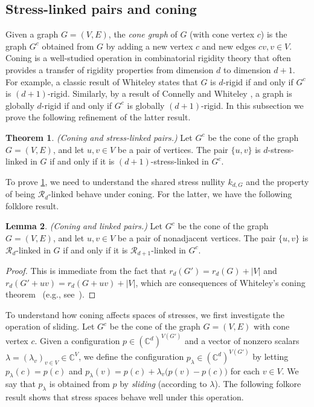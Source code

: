 \documentclass[11pt,a4paper,dvipsnames]{scrartcl}
\theoremstyle{definition}
\newtheorem{theorem}{Theorem}[section]
\newtheorem{lemma}[theorem]{Lemma}
\newcommand{\CC}{\mathbb{C}}
\newcommand{\stressnullity}[1]{k_{d, #1}}
\newcommand{\strongly}[1]{${#1}$-stress-linked}
\newcommand{\coneG}{G^c}
\begin{document}
\subsection{Stress-linked pairs and coning}

Given a graph $G = (V,E)$, the \emph{cone graph} of $G$ (with cone vertex $c$) is the graph $\coneG$ obtained from $G$ by adding a new vertex $c$ and new edges $cv, v \in V$. Coning is a well-studied operation in combinatorial rigidity theory that often provides a transfer of rigidity properties from dimension $d$ to dimension $d+1$. For example, a classic result of Whiteley \cite{whiteley_cones} states that $G$ is $d$-rigid if and only if $\coneG$ is $(d+1)$-rigid. Similarly, by a result of Connelly and Whiteley \cite{connelly.whiteley_2010}, a graph is globally $d$-rigid if and only if $\coneG$ is globally $(d+1)$-rigid. In this subsection we prove the following refinement of the latter result.

\begin{theorem}\label{theorem:stresslinkedconing} \emph{(Coning and stress-linked pairs.)} \newline
    Let $\coneG$ be the cone of the graph $G = (V,E)$, and let $u,v \in V$ be a pair of vertices. The pair $\{u,v\}$ is \strongly{d} in $G$ if and only if it is \strongly{(d+1)} in $\coneG$.
\end{theorem}

To prove \cref{theorem:stresslinkedconing}, we need to understand the shared stress nullity $\stressnullity{G}$ and the property of being $\mathcal{R}_d$-linked behave under coning. For the latter, we have the following folklore result.

\begin{lemma}\label{lemma:linkedconing} \emph{(Coning and linked pairs.)} \newline
    Let $\coneG$ be the cone of the graph $G = (V,E)$, and let $u,v \in V$ be a pair of nonadjacent vertices. The pair $\{u,v\}$ is $\mathcal{R}_d$-linked in $G$ if and only if it is $\mathcal{R}_{d+1}$-linked in $\coneG$. 
\end{lemma}
\begin{proof}
    This is immediate from the fact that $r_d(G') = r_d(G) + |V|$ and $r_d(G' + uv) = r_d(G+uv) + |V|$, which are consequences of Whiteley's coning theorem~\cite{whiteley_cones} (e.g., see~\cite[Theorem 5.2]{garamvolgyi.etal_2022}).
\end{proof}

To understand how coning affects spaces of stresses, we first investigate the operation of sliding.
Let $\coneG$ be the cone of the graph $G = (V,E)$ with cone vertex $c$. Given a configuration $p \in (\CC^d)^{V(G')}$ and a vector of nonzero scalars $\lambda = {(\lambda_v)}_{v \in V} \in \CC^V$, we define the configuration $p_\lambda \in (\CC^d)^{V(G')}$ by letting $p_\lambda(c) = p(c)$ and $p_\lambda(v) = p(c) + \lambda_v\big(p(v) - p(c)\big)$ for each $v \in V$. We say that $p_\lambda$ is obtained from $p$ by \emph{sliding} (according to $\lambda$). The following folkore result shows that stress spaces behave well under this operation.
\end{document}
